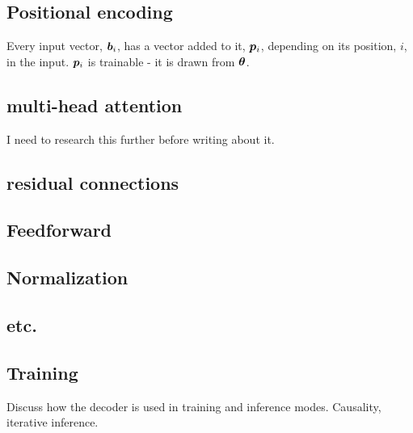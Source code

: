 \subsection{Positional encoding}
Every input vector, ${\bm{b}}_i$, has a vector added to it, ${\bm{p}}_i$, depending on its position, $i$, in the input.
${\bm{p}}_i$ is trainable - it is drawn from ${\bm{\theta}}$.

\subsection{multi-head attention}
I need to research this further before writing about it.

\subsection{residual connections}

\subsection{Feedforward}

\subsection{Normalization}

\subsection{etc.}

\subsection{Training}
Discuss how the decoder is used in training and inference modes.
Causality, iterative inference.
	